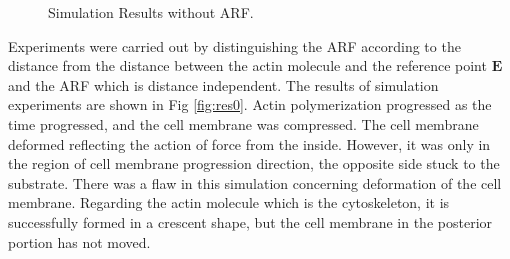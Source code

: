 \documentclass[a4paper,12pt]{book}
\begin{document}
\begin{figure}[h]
{ }%
 \caption{Simulation Results without ARF.}
 \label{fig:res2}
\end{figure}

Experiments were carried out by distinguishing the ARF according to the distance from the distance between the actin molecule and the reference point $\bm{E}$ and the ARF which is distance independent. The results of simulation experiments are shown in Fig \ref{fig:res0}. Actin polymerization progressed as the time progressed, and the cell membrane was compressed. The cell membrane deformed reflecting the action of force from the inside. However, it was only in the region of cell membrane progression direction, the opposite side stuck to the substrate. There was a flaw in this simulation concerning deformation of the cell membrane. Regarding the actin molecule which is the cytoskeleton, it is successfully formed in a crescent shape, but the cell membrane in the posterior portion has not moved.
\end{document}
